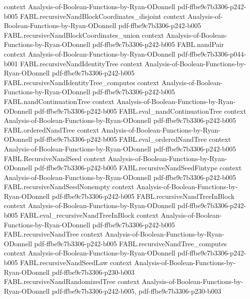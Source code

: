 \begin{theorem}
  {context}
  {Analysis-of-Boolean-Functions-by-Ryan-ODonnell}
  {pdf-ffbe9c7b3306-p242-b005}
\proofstep
  {FABL.recursiveNandBlockCoordinates_disjoint}
  {context}
  {Analysis-of-Boolean-Functions-by-Ryan-ODonnell}
  {pdf-ffbe9c7b3306-p242-b005}
\proofstep
  {FABL.recursiveNandBlockCoordinates_union}
  {context}
  {Analysis-of-Boolean-Functions-by-Ryan-ODonnell}
  {pdf-ffbe9c7b3306-p242-b005}
\proofstep
  {FABL.nandPair}
  {context}
  {Analysis-of-Boolean-Functions-by-Ryan-ODonnell}
  {pdf-ffbe9c7b3306-p044-b001}
\proofstep
  {FABL.recursiveNandIdentityTree}
  {context}
  {Analysis-of-Boolean-Functions-by-Ryan-ODonnell}
  {pdf-ffbe9c7b3306-p242-b005}
\proofstep
  {FABL.recursiveNandIdentityTree_computes}
  {context}
  {Analysis-of-Boolean-Functions-by-Ryan-ODonnell}
  {pdf-ffbe9c7b3306-p242-b005}
\proofstep
  {FABL.nandContinuationTree}
  {context}
  {Analysis-of-Boolean-Functions-by-Ryan-ODonnell}
  {pdf-ffbe9c7b3306-p242-b005}
\proofstep
  {FABL.eval_nandContinuationTree}
  {context}
  {Analysis-of-Boolean-Functions-by-Ryan-ODonnell}
  {pdf-ffbe9c7b3306-p242-b005}
\proofstep
  {FABL.orderedNandTree}
  {context}
  {Analysis-of-Boolean-Functions-by-Ryan-ODonnell}
  {pdf-ffbe9c7b3306-p242-b005}
\proofstep
  {FABL.eval_orderedNandTree}
  {context}
  {Analysis-of-Boolean-Functions-by-Ryan-ODonnell}
  {pdf-ffbe9c7b3306-p242-b005}
\proofstep
  {FABL.RecursiveNandSeed}
  {context}
  {Analysis-of-Boolean-Functions-by-Ryan-ODonnell}
  {pdf-ffbe9c7b3306-p242-b005}
\proofstep
  {FABL.recursiveNandSeedFintype}
  {context}
  {Analysis-of-Boolean-Functions-by-Ryan-ODonnell}
  {pdf-ffbe9c7b3306-p242-b005}
\proofstep
  {FABL.recursiveNandSeedNonempty}
  {context}
  {Analysis-of-Boolean-Functions-by-Ryan-ODonnell}
  {pdf-ffbe9c7b3306-p242-b005}
\proofstep
  {FABL.recursiveNandTreeInBlock}
  {context}
  {Analysis-of-Boolean-Functions-by-Ryan-ODonnell}
  {pdf-ffbe9c7b3306-p242-b005}
\proofstep
  {FABL.eval_recursiveNandTreeInBlock}
  {context}
  {Analysis-of-Boolean-Functions-by-Ryan-ODonnell}
  {pdf-ffbe9c7b3306-p242-b005}
\proofstep
  {FABL.recursiveNandTree}
  {context}
  {Analysis-of-Boolean-Functions-by-Ryan-ODonnell}
  {pdf-ffbe9c7b3306-p242-b005}
\proofstep
  {FABL.recursiveNandTree_computes}
  {context}
  {Analysis-of-Boolean-Functions-by-Ryan-ODonnell}
  {pdf-ffbe9c7b3306-p242-b005}
\proofstep
  {FABL.recursiveNandSeedLaw}
  {context}
  {Analysis-of-Boolean-Functions-by-Ryan-ODonnell}
  {pdf-ffbe9c7b3306-p230-b003}
\proofstep
  {FABL.recursiveNandRandomizedTree}
  {context}
  {Analysis-of-Boolean-Functions-by-Ryan-ODonnell}
  {pdf-ffbe9c7b3306-p242-b005,
    pdf-ffbe9c7b3306-p230-b003}

\end{theorem}
